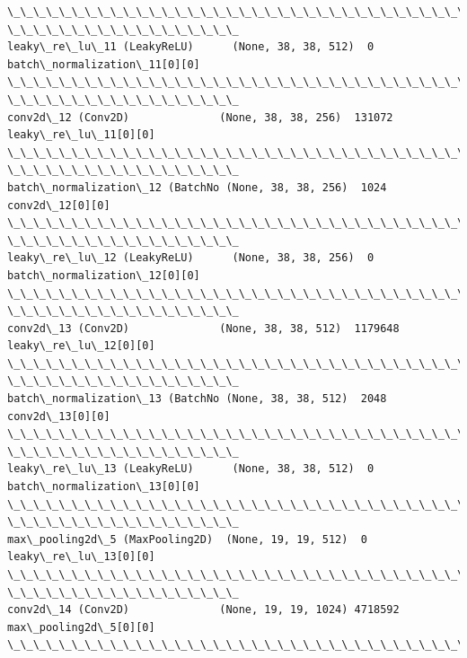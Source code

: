 \documentclass[11pt]{article}
\begin{document}
\begin{Verbatim}[commandchars=\\\{\}]
\_\_\_\_\_\_\_\_\_\_\_\_\_\_\_\_\_\_\_\_\_\_\_\_\_\_\_\_\_\_\_\_\_\_\_\_\_\_\_\_\_\_\_\_\_\_\_\_\_\_\_\_\_\_\_\_\_\_\_\_\_\_\_\_\_\_\_\_\_\_\_\_\_\_\_\_\_\_\_\_
\_\_\_\_\_\_\_\_\_\_\_\_\_\_\_\_\_\_
leaky\_re\_lu\_11 (LeakyReLU)      (None, 38, 38, 512)  0
batch\_normalization\_11[0][0]
\_\_\_\_\_\_\_\_\_\_\_\_\_\_\_\_\_\_\_\_\_\_\_\_\_\_\_\_\_\_\_\_\_\_\_\_\_\_\_\_\_\_\_\_\_\_\_\_\_\_\_\_\_\_\_\_\_\_\_\_\_\_\_\_\_\_\_\_\_\_\_\_\_\_\_\_\_\_\_\_
\_\_\_\_\_\_\_\_\_\_\_\_\_\_\_\_\_\_
conv2d\_12 (Conv2D)              (None, 38, 38, 256)  131072
leaky\_re\_lu\_11[0][0]
\_\_\_\_\_\_\_\_\_\_\_\_\_\_\_\_\_\_\_\_\_\_\_\_\_\_\_\_\_\_\_\_\_\_\_\_\_\_\_\_\_\_\_\_\_\_\_\_\_\_\_\_\_\_\_\_\_\_\_\_\_\_\_\_\_\_\_\_\_\_\_\_\_\_\_\_\_\_\_\_
\_\_\_\_\_\_\_\_\_\_\_\_\_\_\_\_\_\_
batch\_normalization\_12 (BatchNo (None, 38, 38, 256)  1024        conv2d\_12[0][0]
\_\_\_\_\_\_\_\_\_\_\_\_\_\_\_\_\_\_\_\_\_\_\_\_\_\_\_\_\_\_\_\_\_\_\_\_\_\_\_\_\_\_\_\_\_\_\_\_\_\_\_\_\_\_\_\_\_\_\_\_\_\_\_\_\_\_\_\_\_\_\_\_\_\_\_\_\_\_\_\_
\_\_\_\_\_\_\_\_\_\_\_\_\_\_\_\_\_\_
leaky\_re\_lu\_12 (LeakyReLU)      (None, 38, 38, 256)  0
batch\_normalization\_12[0][0]
\_\_\_\_\_\_\_\_\_\_\_\_\_\_\_\_\_\_\_\_\_\_\_\_\_\_\_\_\_\_\_\_\_\_\_\_\_\_\_\_\_\_\_\_\_\_\_\_\_\_\_\_\_\_\_\_\_\_\_\_\_\_\_\_\_\_\_\_\_\_\_\_\_\_\_\_\_\_\_\_
\_\_\_\_\_\_\_\_\_\_\_\_\_\_\_\_\_\_
conv2d\_13 (Conv2D)              (None, 38, 38, 512)  1179648
leaky\_re\_lu\_12[0][0]
\_\_\_\_\_\_\_\_\_\_\_\_\_\_\_\_\_\_\_\_\_\_\_\_\_\_\_\_\_\_\_\_\_\_\_\_\_\_\_\_\_\_\_\_\_\_\_\_\_\_\_\_\_\_\_\_\_\_\_\_\_\_\_\_\_\_\_\_\_\_\_\_\_\_\_\_\_\_\_\_
\_\_\_\_\_\_\_\_\_\_\_\_\_\_\_\_\_\_
batch\_normalization\_13 (BatchNo (None, 38, 38, 512)  2048        conv2d\_13[0][0]
\_\_\_\_\_\_\_\_\_\_\_\_\_\_\_\_\_\_\_\_\_\_\_\_\_\_\_\_\_\_\_\_\_\_\_\_\_\_\_\_\_\_\_\_\_\_\_\_\_\_\_\_\_\_\_\_\_\_\_\_\_\_\_\_\_\_\_\_\_\_\_\_\_\_\_\_\_\_\_\_
\_\_\_\_\_\_\_\_\_\_\_\_\_\_\_\_\_\_
leaky\_re\_lu\_13 (LeakyReLU)      (None, 38, 38, 512)  0
batch\_normalization\_13[0][0]
\_\_\_\_\_\_\_\_\_\_\_\_\_\_\_\_\_\_\_\_\_\_\_\_\_\_\_\_\_\_\_\_\_\_\_\_\_\_\_\_\_\_\_\_\_\_\_\_\_\_\_\_\_\_\_\_\_\_\_\_\_\_\_\_\_\_\_\_\_\_\_\_\_\_\_\_\_\_\_\_
\_\_\_\_\_\_\_\_\_\_\_\_\_\_\_\_\_\_
max\_pooling2d\_5 (MaxPooling2D)  (None, 19, 19, 512)  0
leaky\_re\_lu\_13[0][0]
\_\_\_\_\_\_\_\_\_\_\_\_\_\_\_\_\_\_\_\_\_\_\_\_\_\_\_\_\_\_\_\_\_\_\_\_\_\_\_\_\_\_\_\_\_\_\_\_\_\_\_\_\_\_\_\_\_\_\_\_\_\_\_\_\_\_\_\_\_\_\_\_\_\_\_\_\_\_\_\_
\_\_\_\_\_\_\_\_\_\_\_\_\_\_\_\_\_\_
conv2d\_14 (Conv2D)              (None, 19, 19, 1024) 4718592
max\_pooling2d\_5[0][0]
\_\_\_\_\_\_\_\_\_\_\_\_\_\_\_\_\_\_\_\_\_\_\_\_\_\_\_\_\_\_\_\_\_\_\_\_\_\_\_\_\_\_\_\_\_\_\_\_\_\_\_\_\_\_\_\_\_\_\_\_\_\_\_\_\_\_\_\_\_\_\_\_\_\_\_\_\_\_\_\_

\end{Verbatim}
\end{document}
